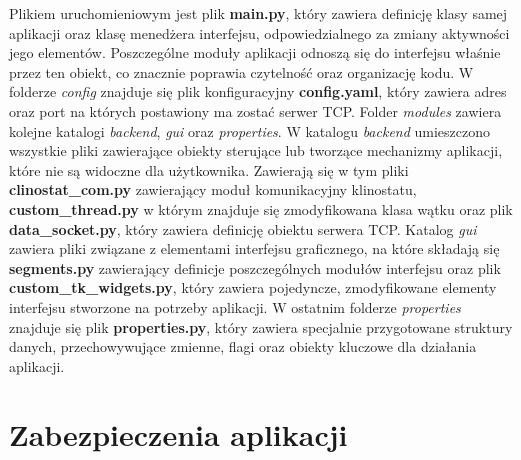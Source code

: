 Plikiem uruchomieniowym jest plik \textbf{main.py}, który zawiera definicję klasy samej aplikacji oraz klasę menedżera interfejsu, odpowiedzialnego za zmiany aktywności jego elementów. Poszczególne moduły aplikacji odnoszą się do interfejsu właśnie przez ten obiekt, co znacznie poprawia czytelność oraz organizację kodu. W folderze \textit{config} znajduje się plik konfiguracyjny \textbf{config.yaml}, który zawiera adres oraz port na których postawiony ma zostać serwer TCP. Folder \textit{modules} zawiera kolejne katalogi \textit{backend}, \textit{gui} oraz \textit{properties}. W katalogu \textit{backend} umieszczono wszystkie pliki zawierające obiekty sterujące lub tworzące mechanizmy aplikacji, które nie są widoczne dla użytkownika. Zawierają się w tym pliki \textbf{clinostat\_com.py} zawierający moduł komunikacyjny klinostatu, \textbf{custom\_thread.py} w którym znajduje się zmodyfikowana klasa wątku oraz plik \textbf{data\_socket.py}, który zawiera definicję obiektu serwera TCP. Katalog \textit{gui} zawiera pliki związane z elementami interfejsu graficznego, na które składają się \textbf{segments.py} zawierający definicje poszczególnych modułów interfejsu oraz plik \textbf{custom\_tk\_widgets.py}, który zawiera pojedyncze, zmodyfikowane elementy interfejsu stworzone na potrzeby aplikacji. W ostatnim folderze \textit{properties} znajduje się plik \textbf{properties.py}, który zawiera specjalnie przygotowane struktury danych, przechowywujące zmienne, flagi oraz obiekty kluczowe dla działania aplikacji. 
\section{Zabezpieczenia aplikacji}

